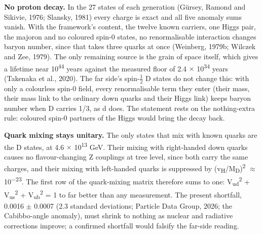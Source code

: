 \documentclass[
  11pt,
]{article}
\begin{document}
\textbf{No proton decay.} In the 27 states of each generation (Gürsey, Ramond and Sikivie, 1976; Slansky, 1981) every charge is exact and all five anomaly sums vanish. With the framework's content, the twelve known carriers, one Higgs pair, the majoron and no coloured spin-0 states, no renormalisable interaction changes baryon number, since that takes three quarks at once (Weinberg, 1979b; Wilczek and Zee, 1979). The only remaining source is the grain of space itself, which gives a lifetime near 10\textsuperscript{44} years against the measured floor of 2.4 \ensuremath{\times} 10\textsuperscript{34} years (Takenaka et al., 2020). The far side's spin-\ensuremath{\frac{1}{2}} D states do not change this: with only a colourless spin-0 field, every renormalisable term they enter (their mass, their mass link to the ordinary down quarks and their Higgs link) keeps baryon number when D carries 1/3, as d does. The statement rests on the nothing-extra rule: coloured spin-0 partners of the Higgs would bring the decay back.

\textbf{Quark mixing stays unitary.} The only states that mix with known quarks are the D states, at 4.6 \ensuremath{\times} 10\textsuperscript{13} GeV. Their mixing with right-handed down quarks causes no flavour-changing Z couplings at tree level, since both carry the same charges, and their mixing with left-handed quarks is suppressed by (v\textsubscript{H}/M\textsubscript{D})\textsuperscript{2} \ensuremath{\approx} 10\textsuperscript{\ensuremath{-}23}. The first row of the quark-mixing matrix therefore sums to one: \textbar V\textsubscript{ud}\textbar{}\textsuperscript{2} + \textbar V\textsubscript{us}\textbar{}\textsuperscript{2} + \textbar V\textsubscript{ub}\textbar{}\textsuperscript{2} = 1 to far better than any measurement. The present shortfall, 0.0016 \ensuremath{\pm} 0.0007 (2.3 standard deviations; Particle Data Group, 2026; the Cabibbo-angle anomaly), must shrink to nothing as nuclear and radiative corrections improve; a confirmed shortfall would falsify the far-side reading.
\end{document}
